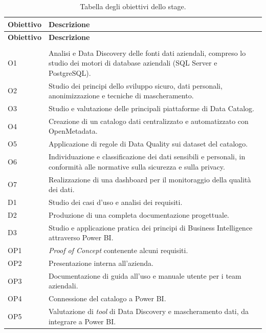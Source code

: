 \begin{longtable}{ p{} p{} }
\toprule
\textbf{Obiettivo} & \textbf{Descrizione} \\
\midrule
\endfirsthead

\toprule
\textbf{Obiettivo} & \textbf{Descrizione} \\
\midrule
\endhead

\midrule
\noalign{\vspace{10pt}}
\caption[]{Tabella degli obiettivi dello stage.} \\
\endfoot

\bottomrule
\noalign{\vspace{10pt}}
\caption{Tabella degli obiettivi dello stage.}
\label{tab:obiettivi-stage}
\endlastfoot

O1 & Analisi e Data Discovery delle fonti dati aziendali, compreso lo studio dei motori di database aziendali (SQL Server e PostgreSQL).\\ \midrule
O2 & Studio dei principi dello sviluppo sicuro, dati personali, anonimizzazione e tecniche di mascheramento.\\ \midrule
O3 & Studio e valutazione delle principali piattaforme di Data Catalog.\\ \midrule
O4 & Creazione di un catalogo dati centralizzato e automatizzato con OpenMetadata.\\ \midrule
O5 & Applicazione di regole di Data Quality sui dataset del catalogo.\\ \midrule
O6 & Individuazione e classificazione dei dati sensibili e personali, in conformità alle normative sulla sicurezza e sulla privacy.\\ \midrule
O7 & Realizzazione di una dashboard per il monitoraggio della qualità dei dati.\\ \midrule

D1 & Studio dei casi d'uso e analisi dei requisiti.\\ \midrule
D2 & Produzione di una completa documentazione progettuale.\\ \midrule
D3 & Studio e applicazione pratica dei principi di Business Intelligence attraverso Power BI.\\ \midrule

OP1 & \emph{Proof of Concept} contenente alcuni requisiti.\\ \midrule
OP2 & Presentazione interna all'azienda.\\ \midrule
OP3 & Documentazione di guida all'uso e manuale utente per i team aziendali.\\ \midrule
OP4 & Connessione del catalogo a Power BI.\\ \midrule
OP5 & Valutazione di \emph{tool} di Data Discovery e mascheramento dati, da integrare a Power BI.\\

\end{longtable}


